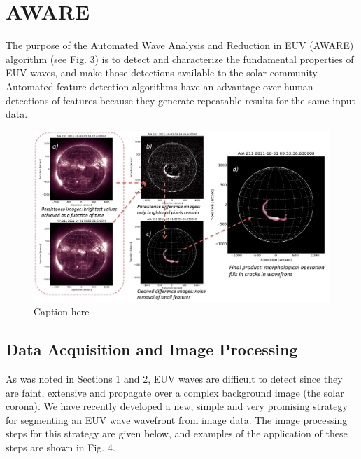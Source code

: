 \section{AWARE}\label{sec:aware}

The purpose of the Automated Wave Analysis and Reduction in EUV (AWARE) algorithm (see Fig. 3) is to detect and characterize the fundamental properties of EUV waves, and make those detections available to the solar community. Automated feature detection algorithms have an advantage over human detections of features because they generate repeatable results for the same input data.

\begin{figure}
\begin{center}
\includegraphics[width=16cm]{aware_figure4.pdf}
\caption{Caption here}
\end{center}
\end{figure}

\subsection{Data Acquisition and Image Processing}

As was noted in Sections 1 and 2, EUV waves are difficult to detect since they are faint, extensive and propagate over a complex background image (the solar corona).  We have recently developed a new, simple and very promising strategy for segmenting an EUV wave wavefront from image data.  The image processing steps for this strategy are given below, and examples of the application of these steps are shown in Fig. 4.

